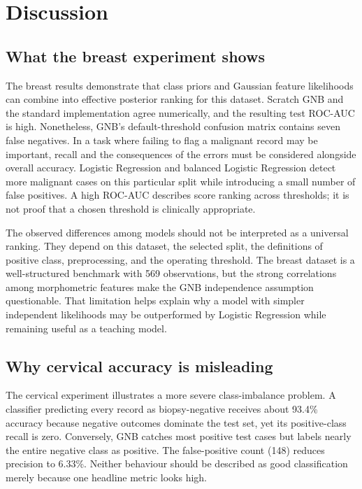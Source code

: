 \documentclass[conference]{IEEEtran}
\begin{document}
\section{Discussion}
\subsection{What the breast experiment shows}
The breast results demonstrate that class priors and Gaussian feature likelihoods can combine into effective posterior ranking for this dataset. Scratch GNB and the standard implementation agree numerically, and the resulting test ROC-AUC is high. Nonetheless, GNB's default-threshold confusion matrix contains seven false negatives. In a task where failing to flag a malignant record may be important, recall and the consequences of the errors must be considered alongside overall accuracy. Logistic Regression and balanced Logistic Regression detect more malignant cases on this particular split while introducing a small number of false positives. A high ROC-AUC describes score ranking across thresholds; it is not proof that a chosen threshold is clinically appropriate.

The observed differences among models should not be interpreted as a universal ranking. They depend on this dataset, the selected split, the definitions of positive class, preprocessing, and the operating threshold. The breast dataset is a well-structured benchmark with 569 observations, but the strong correlations among morphometric features make the GNB independence assumption questionable. That limitation helps explain why a model with simpler independent likelihoods may be outperformed by Logistic Regression while remaining useful as a teaching model.

\subsection{Why cervical accuracy is misleading}
The cervical experiment illustrates a more severe class-imbalance problem. A classifier predicting every record as biopsy-negative receives about 93.4\% accuracy because negative outcomes dominate the test set, yet its positive-class recall is zero. Conversely, GNB catches most positive test cases but labels nearly the entire negative class as positive. The false-positive count (148) reduces precision to 6.33\%. Neither behaviour should be described as good classification merely because one headline metric looks high.
\end{document}
